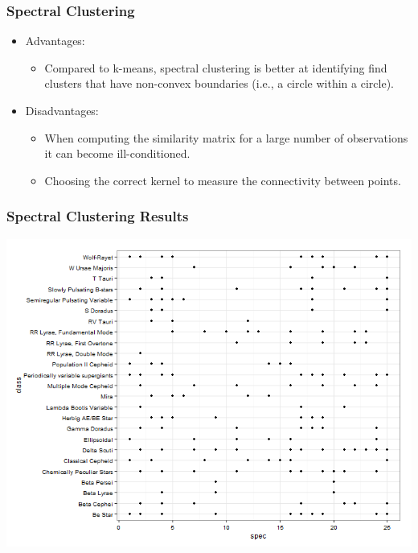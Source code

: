 \documentclass{beamer}
\begin{document}
\begin{frame}
	\frametitle{Spectral Clustering} 
	\begin{itemize}
		\item Advantages: \\
		\begin{itemize}
			\item Compared to k-means, spectral clustering is better at identifying find clusters that have non-convex boundaries (i.e., a circle within a circle).\\
		\end{itemize}

	\item  Disadvantages: \\
		\begin{itemize}
			\item When computing the similarity matrix for a large number of observations it can become ill-conditioned. \\
			\item Choosing the correct kernel to measure the connectivity between points. \\
		\end{itemize}
\end{itemize}
\end{frame}
\begin{frame}
	\frametitle{Spectral Clustering Results}	
\begin{center}
	\includegraphics[scale=0.35]{spec.png}
\end{center}
\end{frame}
\end{document}
